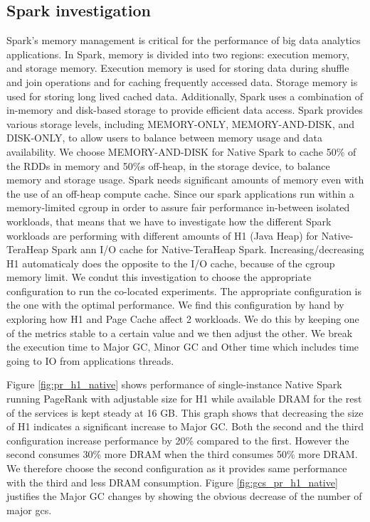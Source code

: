 \subsection{Spark investigation}
Spark's memory management is critical for the performance of big data
analytics applications. In Spark, memory is divided into two
regions: execution memory, and storage memory. Execution memory
is used for storing data during shuffle and join operations and for
caching frequently accessed data. Storage memory is used for storing long lived
cached data. Additionally, Spark uses a combination
of in-memory and disk-based storage to provide efficient data access.
Spark provides various storage levels, including MEMORY-ONLY,
MEMORY-AND-DISK, and DISK-ONLY, to allow users to balance between
memory usage and data availability. We choose MEMORY-AND-DISK for Native Spark 
to cache 50\% of the RDDs in memory and 50\%s off-heap, in the storage device,
to balance memory and storage usage. Spark needs significant amounts
of memory even with the use of an off-heap compute cache. Since our spark applications run within a
memory-limited cgroup in order to assure fair performance in-between
isolated workloads, that means that we have to investigate how the different
Spark workloads are performing with different amounts of H1 (Java Heap) for Native-TeraHeap Spark ann I/O cache for Native-TeraHeap Spark.
Increasing/decreasing H1 automaticaly does the opposite to the I/O
cache, because of the cgroup memory limit. 
We condut this investigation to choose the appropriate configuration to run the co-located experiments.
The appropriate configuration is the one with the optimal performance.
We find this configuration by hand by exploring how H1 and Page Cache affect 2 workloads.
We do this by keeping one of the metrics stable to a certain value and we then adjust the other.
We break the execution time to Major GC, Minor GC and Other time which includes time going to IO from applications threads.

Figure \ref{fig:pr_h1_native} shows performance of single-instance Native Spark
running PageRank with adjustable size for H1 while available DRAM for the rest of the services is kept
steady at 16 GB. This graph shows that decreasing the size of H1
indicates a significant increase to Major GC. Both the second and the third configuration
increase performance by 20\% compared to the first. However the second consumes
30\% more DRAM when the third consumes 50\% more DRAM. We therefore choose the second configuration
as it provides same performance with the third and less DRAM consumption.
Figure \ref{fig:gcs_pr_h1_native} justifies the Major GC changes by showing the obvious
decrease of the number of major gcs.


